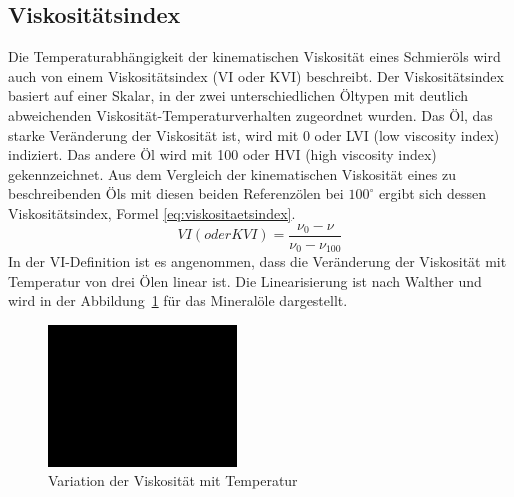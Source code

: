 \subsection*{Viskositätsindex}
\label{sub:Viskositaetsindex}
Die Temperaturabhängigkeit der kinematischen Viskosität eines Schmieröls wird auch von einem Viskositätsindex (VI oder KVI) beschreibt.
Der Viskositätsindex basiert auf einer Skalar, in der zwei unterschiedlichen Öltypen mit deutlich abweichenden Viskosität-Temperaturverhalten zugeordnet wurden.
Das Öl, das starke Veränderung der Viskosität ist, wird mit 0 oder LVI (low viscosity index) indiziert.
Das andere Öl wird mit 100 oder HVI (high viscosity index) gekennzeichnet.
Aus dem Vergleich der kinematischen Viskosität eines zu beschreibenden Öls mit diesen beiden Referenzölen bei $100^\circ$  ergibt sich dessen Viskositätsindex, Formel \ref{eq:viskositaetsindex}.
\begin{equation}
    VI (oder KVI) = \frac{\nu_0 - \nu}{\nu_0 - \nu_{100}}
    \label{eq:viskositaetsindex}
\end{equation}
%
In der VI-Definition ist es angenommen, dass die Veränderung der Viskosität mit Temperatur von drei Ölen linear ist.
Die Linearisierung ist nach Walther\cite{walther} und wird in der Abbildung~\ref{fig:variation_der_viskositaet_mit_temperatur} für das Mineralöle dargestellt.
\begin{figure}[htb]
    \centering
    \includegraphics[width=5cm]{./images/blank_img.jpg}
    \caption{Variation der Viskosität mit Temperatur}
    \label{fig:variation_der_viskositaet_mit_temperatur}
\end{figure}

